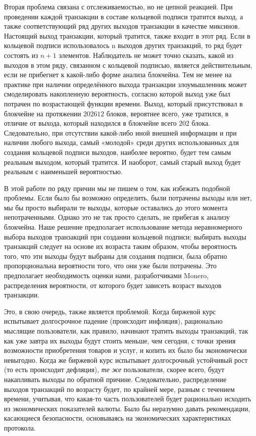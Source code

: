 \documentclass{mrl}
\begin{document}
Вторая проблема связана с отслеживаемостью, но не цепной реакцией. При проведении каждой транзакции в составе кольцевой подписи тратится выход, а также соответствующий ряд других выходов транзакции в качестве миксинов. Настоящий выход транзакции, который тратится, также входит в этот ряд. Если в кольцевой подписи использовалось n выходов других транзакций, то ряд будет состоять из $n+1$ элементов. Наблюдатель не может точно сказать, какой из выходов в этом ряду, связанном с кольцевой подписью, является действительным, если не прибегнет к какой-либо форме анализа блокчейна. Тем не менее на практике при наличии определённого выхода транзакции злоумышленник может смоделировать накопленную вероятность, согласно которой выход уже был потрачен по возрастающей функции времени. Выход, который присутствовал в блокчейне на протяжении $202612$ блоков, вероятнее всего, уже тратился, в отличие от выхода, который находился в блокчейне всего $202$ блока. Следовательно, при отсутствии какой-либо иной внешней информации и при наличии любого выхода, самый «молодой» среди других использованных для создания кольцевой подписи выходов, наиболее вероятно, будет тем самым реальным выходом, который тратится. И наоборот, самый старый выход будет реальным с наименьшей вероятностью.

В этой работе по ряду причин мы не пишем о том, как избежать подобной проблемы. Если было бы возможно определить, были потрачены выходы или нет, мы бы просто выбирали те выходы, которые оставались до этого момента непотраченными. Однако это не так просто сделать, не прибегая к анализу блокчейна. Наше решение предполагает использование метода неравномерного выбора выходов транзакций при создании кольцевой подписи; выбирать выходы транзакций следует на основе их возраста таким образом, чтобы вероятность того, что эти выходы будут выбраны для создания подписи, была обратно пропорциональна вероятности того, что они уже были потрачены. Это предполагает необходимость оценки нами, разработчиками Monero, распределения вероятности, от которого будет зависеть возраст выходов транзакции.

Это, в свою очередь, также является проблемой. Когда биржевой курс испытывает долгосрочное падение (происходит инфляция), рационально мыслящие пользователи, как правило, начинают тратить выходы транзакций, так как уже завтра их выходы будут стоить меньше, чем сегодня, с точки зрения возможности приобретения товаров и услуг, и копить их было бы экономически невыгодно. Когда же биржевой курс испытывает долгосрочный устойчивый рост (то есть происходит дефляция), \textit{те же} пользователи, скорее всего, будут накапливать выходы по обратной причине. Следовательно, распределение выходов транзакций по возрасту будет, по крайней мере, разным с течением времени, учитывая, что какая-то часть пользователей будет рационально исходить из экономических показателей валюты. Было бы неразумно давать рекомендации, касающиеся безопасности, основываясь на экономических характеристиках протокола.
\end{document}
